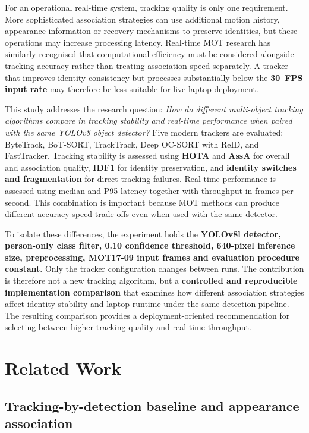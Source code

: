 \documentclass[11pt,a4paper]{article}
\begin{document}
For an operational real-time system, tracking quality is only one requirement. More sophisticated association strategies can use additional motion history, appearance information or recovery mechanisms to preserve identities, but these operations may increase processing latency. Real-time MOT research has similarly recognised that computational efficiency must be considered alongside tracking accuracy rather than treating association speed separately. A tracker that improves identity consistency but processes substantially below the \textbf{30~FPS input rate} may therefore be less suitable for live laptop deployment.

This study addresses the research question: \emph{How do different multi-object tracking algorithms compare in tracking stability and real-time performance when paired with the same YOLOv8 object detector?} Five modern trackers are evaluated: ByteTrack, BoT-SORT, TrackTrack, Deep OC-SORT with ReID, and FastTracker. Tracking stability is assessed using \textbf{HOTA} and \textbf{AssA} for overall and association quality, \textbf{IDF1} for identity preservation, and \textbf{identity switches and fragmentation} for direct tracking failures. Real-time performance is assessed using median and P95 latency together with throughput in frames per second. This combination is important because MOT methods can produce different accuracy-speed trade-offs even when used with the same detector.

To isolate these differences, the experiment holds the \textbf{YOLOv8l detector, person-only class filter, 0.10 confidence threshold, 640-pixel inference size, preprocessing, MOT17-09 input frames and evaluation procedure constant}. Only the tracker configuration changes between runs. The contribution is therefore not a new tracking algorithm, but a \textbf{controlled and reproducible implementation comparison} that examines how different association strategies affect identity stability and laptop runtime under the same detection pipeline. The resulting comparison provides a deployment-oriented recommendation for selecting between higher tracking quality and real-time throughput.

\section{Related Work}

\subsection{Tracking-by-detection baseline and appearance association}
\end{document}
